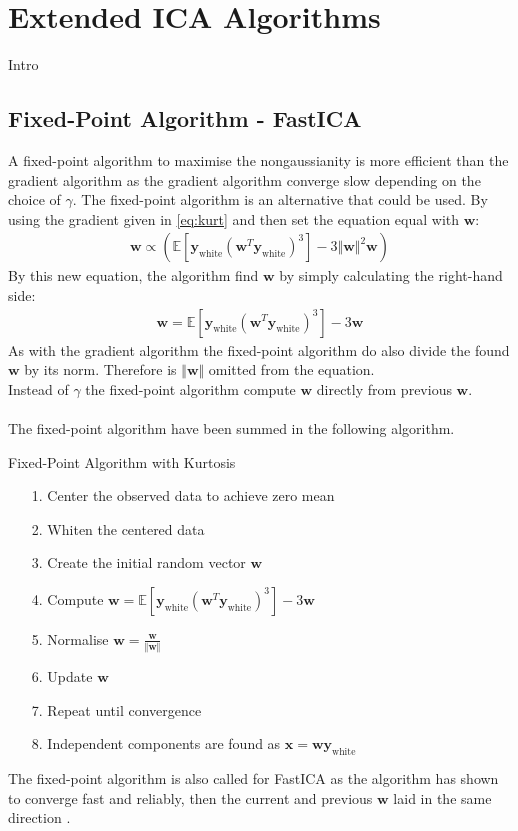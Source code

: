 \chapter{Extended ICA Algorithms}\label{app:ICA}
Intro 

\section{Fixed-Point Algorithm - FastICA}
A fixed-point algorithm to maximise the nongaussianity is more efficient than the gradient algorithm as the gradient algorithm converge slow depending on the choice of $\gamma$. The fixed-point algorithm is an alternative that could be used.
By using the gradient given in \eqref{eq:kurt} and then set the equation equal with $\mathbf{w}$:
\begin{align*}
\mathbf{w} \propto ( \mathbb{E}[\mathbf{y}_{\text{white}}(\mathbf{w}^T \mathbf{y}_{\text{white}})^3] - 3 \Vert \mathbf{w} \Vert^2 \mathbf{w})
\end{align*}
By this new equation, the algorithm find $\mathbf{w}$ by simply calculating the right-hand side:
\begin{align*}
\mathbf{w} = \mathbb{E}[\mathbf{y}_{\text{white}}(\mathbf{w}^T \mathbf{y}_{\text{white}})^3] - 3 \mathbf{w}
\end{align*}
As with the gradient algorithm the fixed-point algorithm do also divide the found $\mathbf{w}$ by its norm. Therefore is $\Vert \mathbf{w} \Vert$ omitted from the equation.
\\
Instead of $\gamma$ the fixed-point algorithm compute $\mathbf{w}$ directly from previous $\mathbf{w}$.
\\ \\
The fixed-point algorithm have been summed in the following algorithm.
\begin{algorithm}[H]
\caption{Fixed-Point Algorithm with Kurtosis}
\begin{itemize}
\item[1.] Center the observed data to achieve zero mean
\item[2.] Whiten the centered data
\item[3.] Create the initial random vector $\mathbf{w}$ 
\item[4.] Compute $\mathbf{w} = \mathbb{E}[\mathbf{y}_{\text{white}}(\mathbf{w}^T \mathbf{y}_{\text{white}})^3] - 3 \mathbf{w}$
\item[5.] Normalise $\mathbf{w} = \frac{\mathbf{w}}{\Vert \mathbf{w} \Vert}$
\item[6.] Update $\mathbf{w}$
\item[7.] Repeat until convergence
\item[8.] Independent components are found as $\mathbf{x} = \mathbf{w} \mathbf{y}_{\text{white}}$
\end{itemize}
\end{algorithm}
The fixed-point algorithm is also called for FastICA as the algorithm has shown to converge fast and reliably, then the current and previous $\mathbf{w}$ laid in the same direction \cite[p. 179]{ICA}. 

